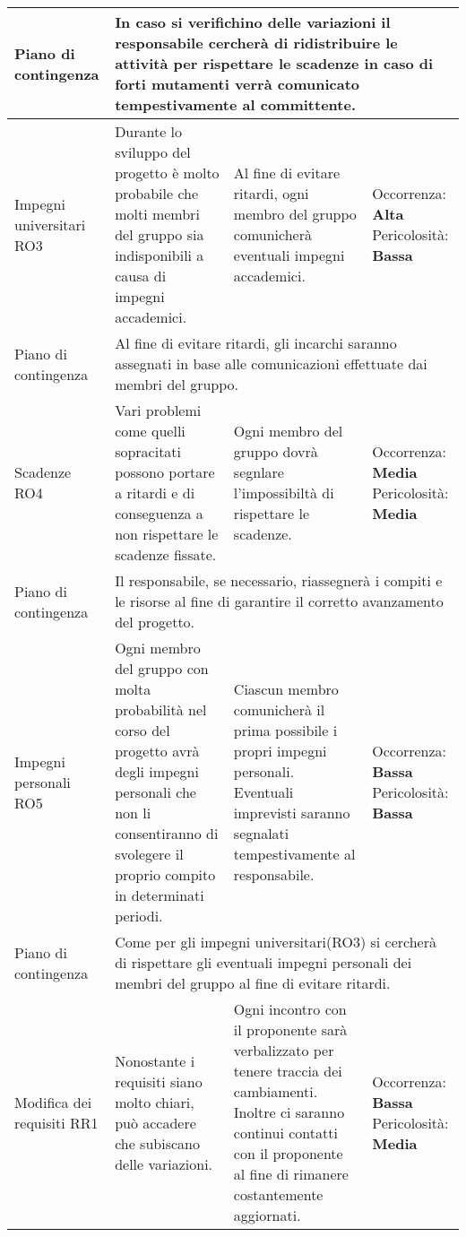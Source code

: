 \begin{center}
\begin{longtable}{|p{}|p{}|p{}|p{}|}
		\hline
		\centering Piano di contingenza & \multicolumn{3}{p{0.84\textwidth}}{In caso si verifichino delle variazioni il responsabile cercherà di ridistribuire le attività per rispettare le scadenze  in caso di forti mutamenti verrà comunicato tempestivamente al committente.  } \\
		\hline
		\centering Impegni universitari RO3& Durante lo sviluppo del progetto è molto probabile che molti membri del gruppo sia indisponibili a causa di impegni accademici.  &Al fine di evitare ritardi, ogni membro del gruppo comunicherà eventuali impegni accademici. & Occorrenza: \textbf{Alta} Pericolosità: \textbf{Bassa} \\
		\hline 
		\centering Piano di contingenza & \multicolumn{3}{p{0.84\textwidth}}{Al fine di evitare ritardi, gli incarchi saranno assegnati in base alle comunicazioni effettuate dai membri del gruppo.} \\
		\hline
		\centering Scadenze RO4& Vari problemi come quelli sopracitati possono portare a ritardi e di conseguenza a non rispettare le scadenze fissate.  & Ogni membro del gruppo dovrà segnlare l'impossibiltà di rispettare le scadenze. & Occorrenza: \textbf{Media} Pericolosità: \textbf{Media} \\
		\hline
		\centering Piano di contingenza & \multicolumn{3}{p{0.84\textwidth}}{Il responsabile, se necessario, riassegnerà i compiti e le risorse al fine di garantire il corretto avanzamento del progetto.} \\
		\hline
		\centering Impegni personali RO5& Ogni membro del gruppo con molta probabilità nel corso del progetto avrà degli impegni personali che non li consentiranno di svolegere il proprio compito in determinati periodi. & Ciascun membro comunicherà il prima possibile i propri impegni personali. Eventuali imprevisti saranno segnalati tempestivamente al responsabile. & Occorrenza: \textbf{Bassa} Pericolosità: \textbf{Bassa} \\
		\hline
		\centering Piano di contingenza & \multicolumn{3}{p{0.84\textwidth}}{Come per gli impegni universitari(RO3) si cercherà di rispettare gli eventuali impegni personali dei membri del gruppo al fine di evitare ritardi.} \\
		\hline
		\centering Modifica dei requisiti RR1& Nonostante i requisiti siano molto chiari, può accadere che subiscano delle variazioni.  & Ogni incontro con il proponente sarà verbalizzato per tenere traccia dei cambiamenti. Inoltre ci saranno continui contatti con il proponente al fine di rimanere costantemente aggiornati. & Occorrenza: \textbf{Bassa} Pericolosità: \textbf{Media} \\

\end{longtable}
\end{center}
